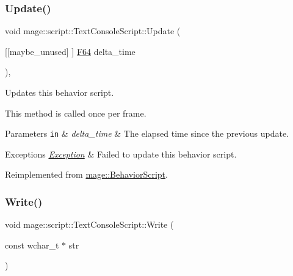 \hypertarget{classmage_1_1script_1_1_text_console_script_afc3d3099761c9c96b1a87ca07f06ddec}{}\label{classmage_1_1script_1_1_text_console_script_afc3d3099761c9c96b1a87ca07f06ddec} 
\subsubsection{\texorpdfstring{Update()}{Update()}}
{\footnotesize\ttfamily void mage\+::script\+::\+Text\+Console\+Script\+::\+Update (\begin{DoxyParamCaption}\item[{\mbox{[}\mbox{[}maybe\+\_\+unused\mbox{]} \mbox{]} \hyperlink{namespacemage_ad26233bbec640deda836e572c1a23708}{F64}}]{delta\+\_\+time }\end{DoxyParamCaption})\hspace{0.3cm}{\ttfamily [override]}, {\ttfamily [virtual]}}

Updates this behavior script.

This method is called once per frame.


\begin{DoxyParams}[1]{Parameters}
\mbox{\tt in}  & {\em delta\+\_\+time} & The elapsed time since the previous update. \\
\hline
\end{DoxyParams}

\begin{DoxyExceptions}{Exceptions}
{\em \hyperlink{classmage_1_1_exception}{Exception}} & Failed to update this behavior script. \\
\hline
\end{DoxyExceptions}


Reimplemented from \hyperlink{classmage_1_1_behavior_script_afb9cf3759edf8876416d1df85489cba6}{mage\+::\+Behavior\+Script}.

\hypertarget{classmage_1_1script_1_1_text_console_script_a210034f6226856e44d25c7796c3a2db9}{}\label{classmage_1_1script_1_1_text_console_script_a210034f6226856e44d25c7796c3a2db9} 
\subsubsection{\texorpdfstring{Write()}{Write()}}
{\footnotesize\ttfamily void mage\+::script\+::\+Text\+Console\+Script\+::\+Write (\begin{DoxyParamCaption}\item[{const wchar\+\_\+t $\ast$}]{str }\end{DoxyParamCaption})}

